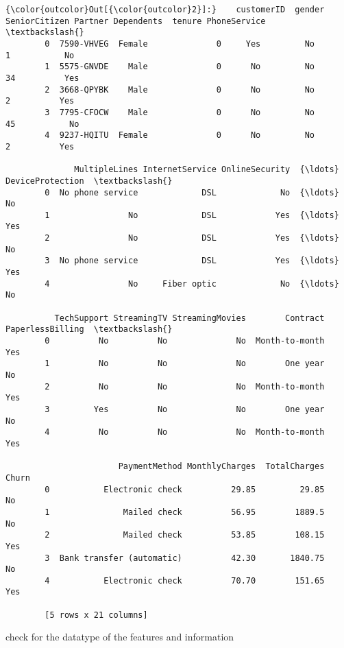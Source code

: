 \documentclass[11pt]{article}
\begin{document}
\begin{Verbatim}[commandchars=\\\{\}]
{\color{outcolor}Out[{\color{outcolor}2}]:}    customerID  gender  SeniorCitizen Partner Dependents  tenure PhoneService  \textbackslash{}
        0  7590-VHVEG  Female              0     Yes         No       1           No   
        1  5575-GNVDE    Male              0      No         No      34          Yes   
        2  3668-QPYBK    Male              0      No         No       2          Yes   
        3  7795-CFOCW    Male              0      No         No      45           No   
        4  9237-HQITU  Female              0      No         No       2          Yes   
        
              MultipleLines InternetService OnlineSecurity  {\ldots}  DeviceProtection  \textbackslash{}
        0  No phone service             DSL             No  {\ldots}                No   
        1                No             DSL            Yes  {\ldots}               Yes   
        2                No             DSL            Yes  {\ldots}                No   
        3  No phone service             DSL            Yes  {\ldots}               Yes   
        4                No     Fiber optic             No  {\ldots}                No   
        
          TechSupport StreamingTV StreamingMovies        Contract PaperlessBilling  \textbackslash{}
        0          No          No              No  Month-to-month              Yes   
        1          No          No              No        One year               No   
        2          No          No              No  Month-to-month              Yes   
        3         Yes          No              No        One year               No   
        4          No          No              No  Month-to-month              Yes   
        
                       PaymentMethod MonthlyCharges  TotalCharges Churn  
        0           Electronic check          29.85         29.85    No  
        1               Mailed check          56.95        1889.5    No  
        2               Mailed check          53.85        108.15   Yes  
        3  Bank transfer (automatic)          42.30       1840.75    No  
        4           Electronic check          70.70        151.65   Yes  
        
        [5 rows x 21 columns]
\end{Verbatim}
            
    check for the datatype of the features and information
\end{document}

